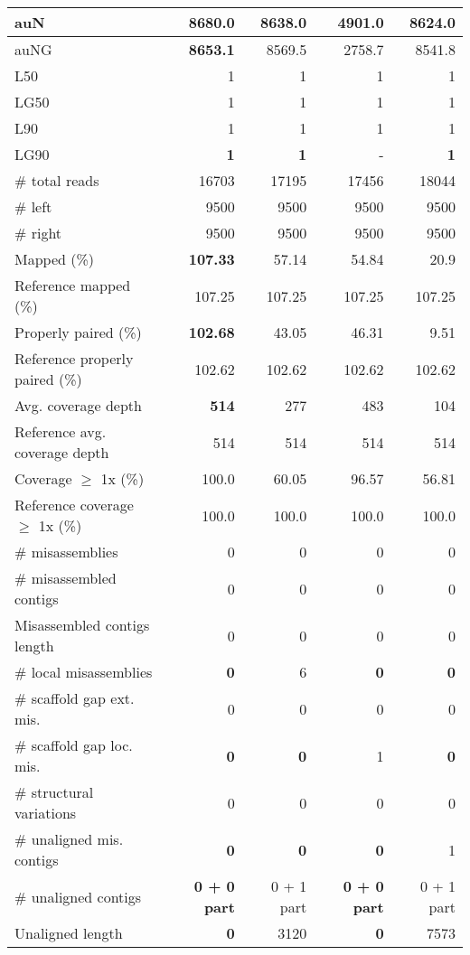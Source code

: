 \documentclass[12pt,a4paper]{article}
\begin{document}
\begin{table}[ht]
\begin{center}
\begin{tabular}{|l*{4}{|r}|}
auN & {\bf 8680.0} & 8638.0 & 4901.0 & 8624.0 \\ \hline
auNG & {\bf 8653.1} & 8569.5 & 2758.7 & 8541.8 \\ \hline
L50 & 1 & 1 & 1 & 1 \\ \hline
LG50 & 1 & 1 & 1 & 1 \\ \hline
L90 & 1 & 1 & 1 & 1 \\ \hline
LG90 & {\bf 1} & {\bf 1} & - & {\bf 1} \\ \hline
\# total reads & 16703 & 17195 & 17456 & 18044 \\ \hline
\# left & 9500 & 9500 & 9500 & 9500 \\ \hline
\# right & 9500 & 9500 & 9500 & 9500 \\ \hline
Mapped (\%) & {\bf 107.33} & 57.14 & 54.84 & 20.9 \\ \hline
Reference mapped (\%) & 107.25 & 107.25 & 107.25 & 107.25 \\ \hline
Properly paired (\%) & {\bf 102.68} & 43.05 & 46.31 & 9.51 \\ \hline
Reference properly paired (\%) & 102.62 & 102.62 & 102.62 & 102.62 \\ \hline
Avg. coverage depth & {\bf 514} & 277 & 483 & 104 \\ \hline
Reference avg. coverage depth & 514 & 514 & 514 & 514 \\ \hline
Coverage $\geq$ 1x (\%) & 100.0 & 60.05 & 96.57 & 56.81 \\ \hline
Reference coverage $\geq$ 1x (\%) & 100.0 & 100.0 & 100.0 & 100.0 \\ \hline
\# misassemblies & 0 & 0 & 0 & 0 \\ \hline
\# misassembled contigs & 0 & 0 & 0 & 0 \\ \hline
Misassembled contigs length & 0 & 0 & 0 & 0 \\ \hline
\# local misassemblies & {\bf 0} & 6 & {\bf 0} & {\bf 0} \\ \hline
\# scaffold gap ext. mis. & 0 & 0 & 0 & 0 \\ \hline
\# scaffold gap loc. mis. & {\bf 0} & {\bf 0} & 1 & {\bf 0} \\ \hline
\# structural variations & 0 & 0 & 0 & 0 \\ \hline
\# unaligned mis. contigs & {\bf 0} & {\bf 0} & {\bf 0} & 1 \\ \hline
\# unaligned contigs & {\bf 0 + 0 part} & 0 + 1 part & {\bf 0 + 0 part} & 0 + 1 part \\ \hline
Unaligned length & {\bf 0} & 3120 & {\bf 0} & 7573 \\ \hline

\end{tabular}
\end{center}
\end{table}
\end{document}
